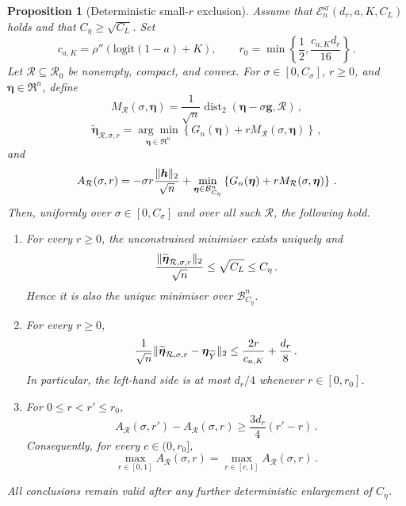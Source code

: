 \documentclass{article}
\makeatletter
\newtheorem{proposition}[theorem]{Proposition}
\theoremstyle{definition}
\newcommand{\vnorm}[1]{%
	\ensuremath{%
		\if@display
		\left\| #1 \right\|
		\else
		\| #1 \|
		\fi
	}%
}
\newcommand*{\bb}{\boldsymbol}
\newcommand{\logit}[1]{\ensuremath{\textrm{logit}(#1)}}
\def\bh{\bb{h}}
\def\bg{\bb{g}}
\def\Ytil{\widetilde{Y}}
\def\bEtaYtil{\bb{\eta}_{\Ytil}}
\makeatother
\begin{document}
\begin{bibunit}
\begin{proposition}[Deterministic small-$r$ exclusion]
\label{prop:small_r_exclusion}
Assume that $\mathcal E_n^{\mathrm{sr}}(d_r,a,K,C_L)$ holds and that
$C_\eta\geq\sqrt{C_L}$. Set
\begin{equation}
\label{eq:small_r_radius}
	c_{a,K}
	=
	\rho''(\logit{1-a}+K),
	\qquad
	r_0
	=
	\min\left\{
		\frac12,
		\frac{c_{a,K} d_r}{16}
	\right\}\,.
\end{equation}
Let $\mathcal R\subseteq\mathcal R_0$ be nonempty, compact, and convex. For
$\sigma\in[0,C_\sigma]$, $r\geq0$, and $\bb\eta\in\Re^n$, define
$$
	M_{\mathcal R}(\sigma,\bb\eta)
	=
	\frac1{\sqrt n}
	\operatorname{dist}_2
	\left(
		\bb\eta-\sigma\bg,
		\mathcal R
	\right)\,,
$$
$$
	\widetilde{\bb\eta}_{\mathcal R,\sigma,r}
	=
	\underset{\bb\eta\in\Re^n}{\arg\min}
	\left\{
		G_n(\bb\eta)
		+
		rM_{\mathcal R}(\sigma,\bb\eta)
	\right\}\,,
$$
and
$$
	A_{\mathcal R}(\sigma,r)
	=
	-\sigma r\frac{\vnorm{\bh}_2}{\sqrt n}
	+
	\underset{\bb\eta\in\mathcal B^n_{C_\eta}}{\min}
	\left\{
		G_n(\bb\eta)
		+
		rM_{\mathcal R}(\sigma,\bb\eta)
	\right\}\,.
$$
Then, uniformly over $\sigma\in[0,C_\sigma]$ and over all such
$\mathcal R$, the following hold.
\begin{enumerate}[label=(\roman*)]
	\item For every $r\geq0$, the unconstrained minimiser exists uniquely and
	$$
		\frac{
			\vnorm{\widetilde{\bb\eta}_{\mathcal R,\sigma,r}}_2
		}{
			\sqrt n
		}
		\leq
		\sqrt{C_L}
		\leq
		C_\eta\,.
	$$
	Hence it is also the unique minimiser over
	$\mathcal B^n_{C_\eta}$.

	\item For every $r\geq0$,
	\begin{equation}
	\label{eq:small_r_displacement}
		\frac1{\sqrt n}
		\vnorm{
			\widetilde{\bb\eta}_{\mathcal R,\sigma,r}
			-
			\bEtaYtil
		}_2
		\leq
		\frac{2r}{c_{a,K}}
		+
		\frac{d_r}{8}\,.
	\end{equation}
	In particular, the left-hand side is at most $d_r/4$ whenever
	$r\in[0,r_0]$.

	\item For $0\leq r<r'\leq r_0$,
	\begin{equation}
	\label{eq:small_r_profile_increment}
		A_{\mathcal R}(\sigma,r')
		-
		A_{\mathcal R}(\sigma,r)
		\geq
		\frac{3d_r}{4}(r'-r)\,.
	\end{equation}
	Consequently, for every $c\in(0,r_0]$,
	\begin{equation}
	\label{eq:small_r_profile_exclusion}
		\underset{r\in[0,1]}{\max}
		A_{\mathcal R}(\sigma,r)
		=
		\underset{r\in[c,1]}{\max}
		A_{\mathcal R}(\sigma,r)\,.
	\end{equation}
\end{enumerate}
All conclusions remain valid after any further deterministic enlargement of
$C_\eta$.
\end{proposition}


\end{bibunit}
\end{document}
